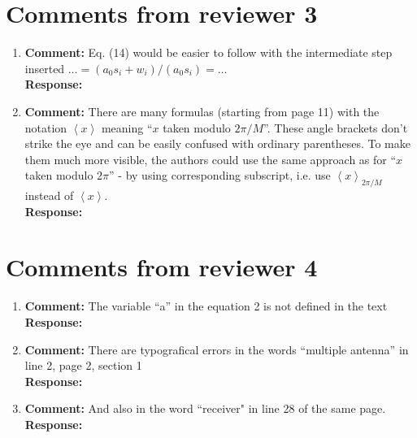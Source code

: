 \documentclass{article}
\newcommand{\fracpart}[1]{\left\langle #1 \right\rangle}
\begin{document}
\section{Comments from reviewer 3}

\begin{enumerate}

\item \textbf{Comment:}  Eq. (14) would be easier to follow with the intermediate step inserted $\dots = (a_0s_i + w_i)/(a_0s_i) = \dots$ \\
\textbf{Response:}

\item \textbf{Comment:}  There are many formulas (starting from page 11) with the notation $\fracpart{x}$ meaning ``$x$ taken modulo $2\pi/M$''. These angle brackets don't strike the eye and can be easily confused with ordinary parentheses. To make them much more visible, the authors could use the same approach as for ``$x$ taken modulo $2\pi$'' - by using corresponding subscript, i.e. use $\fracpart{x}_{2\pi/M}$ instead of $\fracpart{x}$. \\
\textbf{Response:}

 \end{enumerate}

\section{Comments from reviewer 4}

\begin{enumerate}

\item \textbf{Comment:}  The variable  ``a'' in the equation 2 is not defined in the text \\
\textbf{Response:}

\item \textbf{Comment:}  There are typografical errors in the words  ``multiple antenna'' in line 2, page 2, section 1 \\
\textbf{Response:}

\item \textbf{Comment:}  And also in the word ``receiver" in line 28 of the same page.
 \\
\textbf{Response:}


\end{enumerate}



\end{document}
